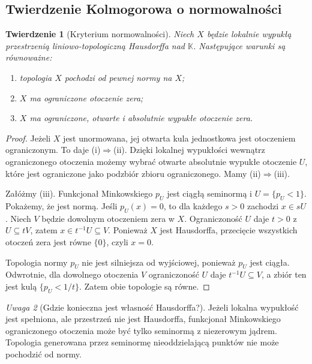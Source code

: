 \documentclass[11pt,a4paper]{article}
\numberwithin{equation}{section}
\theoremstyle{plain}
\newtheorem{twierdzenie}{Twierdzenie}[section]
\theoremstyle{definition}
\theoremstyle{remark}
\newtheorem{uwaga}[twierdzenie]{Uwaga}
\newcommand{\K}{\mathbb K}
\begin{document}
\subsection{Twierdzenie Kolmogorowa o normowalności}

\begin{twierdzenie}[Kryterium normowalności]
\label{thm:kolmogorov-normability}
Niech $X$ będzie lokalnie wypukłą przestrzenią
liniowo-topologiczną Hausdorffa nad $\K$.
Następujące warunki są równoważne:
\begin{enumerate}[label=\textup{(\roman*)}]
\item topologia $X$ pochodzi od pewnej normy na $X$;
\item $X$ ma ograniczone otoczenie zera;
\item $X$ ma ograniczone, otwarte i absolutnie wypukłe otoczenie zera.
\end{enumerate}
\end{twierdzenie}
\begin{proof}
Jeżeli $X$ jest unormowana, jej otwarta kula jednostkowa
jest otoczeniem ograniczonym. To daje (i)$\Rightarrow$(ii).
Dzięki lokalnej wypukłości wewnątrz ograniczonego
otoczenia możemy wybrać otwarte absolutnie wypukłe
otoczenie $U$, które jest ograniczone jako podzbiór
zbioru ograniczonego. Mamy (ii)$\Rightarrow$(iii).

Załóżmy (iii). Funkcjonał Minkowskiego $p_U$ jest
ciągłą seminormą i $U=\{p_U<1\}$.
Pokażemy, że jest normą. Jeśli $p_U(x)=0$,
to dla każdego $s>0$ zachodzi $x\in sU$.
Niech $V$ będzie dowolnym otoczeniem zera w $X$.
Ograniczoność $U$ daje $t>0$ z $U\subseteq tV$,
zatem $x\in t^{-1}U\subseteq V$.
Ponieważ $X$ jest Hausdorffa, przecięcie wszystkich
otoczeń zera jest równe $\{0\}$, czyli $x=0$.

Topologia normy $p_U$ nie jest silniejsza od wyjściowej,
ponieważ $p_U$ jest ciągła. Odwrotnie, dla dowolnego
otoczenia $V$ ograniczoność $U$ daje
$t^{-1}U\subseteq V$, a zbiór ten jest kulą
$\{p_U<1/t\}$. Zatem obie topologie są równe.
\end{proof}

\begin{uwaga}[Gdzie konieczna jest własność Hausdorffa?]
Jeżeli lokalna wypukłość jest spełniona, ale przestrzeń
nie jest Hausdorffa, funkcjonał Minkowskiego ograniczonego
otoczenia może być tylko seminormą z niezerowym jądrem.
Topologia generowana przez seminormę nieoddzielającą punktów
nie może pochodzić od normy.
\end{uwaga}
\end{document}
